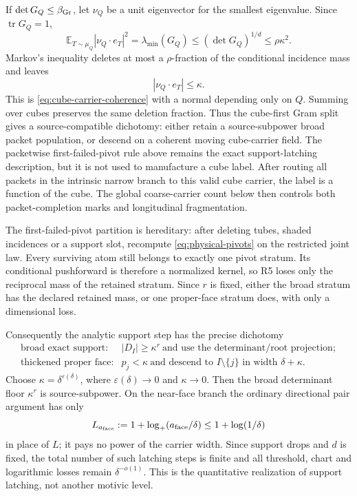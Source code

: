 \documentclass[11pt]{article}
\begin{document}
If \(\det G_Q\le\beta_{\rm Gr}\), let \(\nu_Q\) be a unit eigenvector for the
smallest eigenvalue.  Since \(\operatorname{tr}G_Q=1\),
\[
 \mathbb E_{T\sim\mu_Q}|\nu_Q\cdot e_T|^2
 =\lambda_{\min}(G_Q)
 \le(\det G_Q)^{1/d}
 \le\rho\kappa^2.
\]
Markov's inequality deletes at most a \(\rho\)-fraction of the conditional
incidence mass and leaves
\begin{equation}\label{eq:intrinsic-cube-normal-hardening}
 |\nu_Q\cdot e_T|\le\kappa.
\end{equation}
This is \eqref{eq:cube-carrier-coherence} with a normal depending only on
\(Q\).  Summing over cubes preserves the same deletion fraction.  Thus the
cube-first Gram split gives a source-compatible dichotomy: either retain a
source-subpower broad packet population, or descend on a coherent moving
cube-carrier field.  The packetwise first-failed-pivot rule above remains the
exact support-latching description, but it is not used to manufacture a
cube label.  After routing all packets in the intrinsic narrow branch to this
valid cube carrier, the label is a function of the cube.  The global
coarse-carrier count below then controls both packet-completion marks and
longitudinal fragmentation.

The first-failed-pivot partition is hereditary: after deleting tubes, shaded
incidences or a support slot, recompute \eqref{eq:physical-pivots} on the
restricted joint law.
Every surviving atom still belongs to exactly one pivot stratum.  Its
conditional pushforward is therefore a normalized kernel, so R5 loses only
the reciprocal mass of the retained stratum.  Since \(r\) is fixed, either the
broad stratum has the declared retained mass, or one proper-face stratum does,
with only a dimensional loss.

Consequently the analytic support step has the precise dichotomy
\begin{equation}\label{eq:quantitative-latching-dichotomy}
 \boxed{
 \begin{array}{ll}
 \text{broad exact support:}
   & |D_I|\ge\kappa^r
     \ \text{and use the determinant/root projection};\\[0.2em]
 \text{thickened proper face:}
   & p_j<\kappa
     \ \text{and descend to }I\setminus\{j\}
       \text{ in width }\delta+\kappa.
 \end{array}}
\end{equation}
Choose \(\kappa=\delta^{\varepsilon(\delta)}\), where
\(\varepsilon(\delta)\to0\) and \(\kappa\to0\).  Then the broad determinant
floor \(\kappa^r\) is source-subpower.  On the near-face branch the ordinary
directional pair argument has only
\[
 L_{a_{\rm face}}
 :=1+\log_+(a_{\rm face}/\delta)
 \le1+\log(1/\delta)
\]
in place of \(L\); it pays no power of the carrier width.  Since support drops
and \(d\) is fixed, the total number of such latching steps is finite and all
threshold, chart and logarithmic losses remain \(\delta^{-o(1)}\).  This is the
quantitative realization of support latching, not another motivic level.
\end{document}

